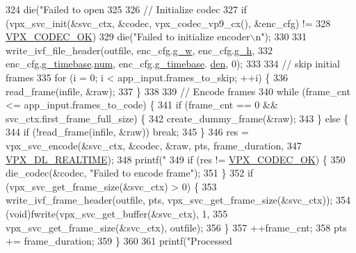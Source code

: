 \begin{DoxyCodeInclude}
{{{{{{{{{{{{{324     die(\textcolor{stringliteral}{"Failed to open %
325 
326   \textcolor{comment}{// Initialize codec}
327   \textcolor{keywordflow}{if} (vpx\_svc\_init(&svc\_ctx, &codec, vpx\_codec\_vp9\_cx(), &enc\_cfg) !=
328       \hyperlink{group__codec_ggada1084710837ad363b92f2379dd2b8d2af1dcde74b1c5ff7b29f31246dfd90986}{VPX\_CODEC\_OK})
329     die(\textcolor{stringliteral}{"Failed to initialize encoder\(\backslash\)n"});
330 
331   write\_ivf\_file\_header(outfile, enc\_cfg.\hyperlink{structvpx__codec__enc__cfg_a5c165f5b41ca1158f2883983a2b7709c}{g\_w}, enc\_cfg.\hyperlink{structvpx__codec__enc__cfg_a4132bd89ce85bce7c08f2cc3b6f2b82e}{g\_h},
332                         enc\_cfg.\hyperlink{structvpx__codec__enc__cfg_a6498d378e4c29ef3e22258289e481087}{g\_timebase}.\hyperlink{structvpx__rational_ae7774f21a22c9bef3aa73156c79f4731}{num}, enc\_cfg.\hyperlink{structvpx__codec__enc__cfg_a6498d378e4c29ef3e22258289e481087}{g\_timebase}.
      \hyperlink{structvpx__rational_a29dd2ab4001377b3aa21885ef969759f}{den}, 0);
333 
334   \textcolor{comment}{// skip initial frames}
335   \textcolor{keywordflow}{for} (i = 0; i < app\_input.frames\_to\_skip; ++i) \{
336     read\_frame(infile, &raw);
337   \}
338 
339   \textcolor{comment}{// Encode frames}
340   \textcolor{keywordflow}{while} (frame\_cnt <= app\_input.frames\_to\_code) \{
341     \textcolor{keywordflow}{if} (frame\_cnt == 0 && svc\_ctx.first\_frame\_full\_size) \{
342       create\_dummy\_frame(&raw);
343     \} \textcolor{keywordflow}{else} \{
344       \textcolor{keywordflow}{if} (!read\_frame(infile, &raw)) \textcolor{keywordflow}{break};
345     \}
346     res = vpx\_svc\_encode(&svc\_ctx, &codec, &raw, pts, frame\_duration,
347                          \hyperlink{group__encoder_ga04253cc9ec1146d72fa8bb86bcf32144}{VPX\_DL\_REALTIME});
348     printf(\textcolor{stringliteral}{"%
349     \textcolor{keywordflow}{if} (res != \hyperlink{group__codec_ggada1084710837ad363b92f2379dd2b8d2af1dcde74b1c5ff7b29f31246dfd90986}{VPX\_CODEC\_OK}) \{
350       die\_codec(&codec, \textcolor{stringliteral}{"Failed to encode frame"});
351     \}
352     \textcolor{keywordflow}{if} (vpx\_svc\_get\_frame\_size(&svc\_ctx) > 0) \{
353       write\_ivf\_frame\_header(outfile, pts, vpx\_svc\_get\_frame\_size(&svc\_ctx));
354       (void)fwrite(vpx\_svc\_get\_buffer(&svc\_ctx), 1,
355                    vpx\_svc\_get\_frame\_size(&svc\_ctx), outfile);
356     \}
357     ++frame\_cnt;
358     pts += frame\_duration;
359   \}
360 
361   printf(\textcolor{stringliteral}{"Processed %
}}}}}}}}}}}}}}}}
\end{DoxyCodeInclude}
